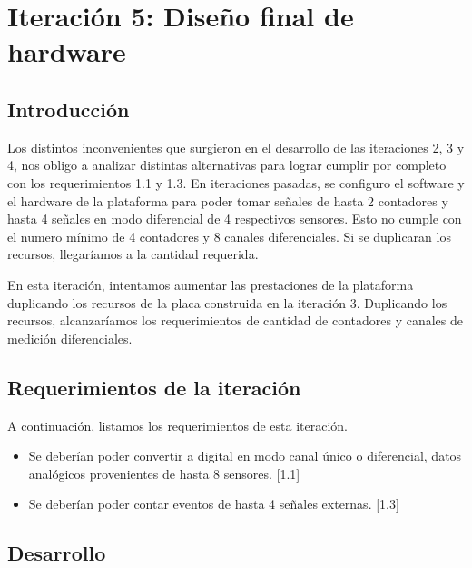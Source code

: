 \chapter{Iteración 5: Diseño final de hardware} %
\label{cha:iteracion_5}

\section{Introducción} %
\label{it5:sec:introduccion}

Los distintos inconvenientes que surgieron en el desarrollo de las iteraciones 2, 3 y 4, nos obligo a analizar distintas alternativas para lograr cumplir por completo con los requerimientos 1.1 y 1.3. En iteraciones pasadas, se configuro el software y el hardware de la plataforma para poder tomar señales de hasta 2 contadores y hasta 4 señales en modo diferencial de 4 respectivos sensores. Esto no cumple con el numero mínimo de 4 contadores y 8 canales diferenciales. Si se duplicaran los recursos, llegaríamos a la cantidad requerida.

En esta iteración, intentamos aumentar las prestaciones de la plataforma duplicando los recursos de la placa construida en la iteración 3. Duplicando los recursos, alcanzaríamos los requerimientos de cantidad de contadores y canales de medición diferenciales.


\section{Requerimientos de la iteración} %
\label{it5:sec:requerimientos_de_la_iteracion}

A continuación, listamos los requerimientos de esta iteración.

\begin{itemize}
  \item Se deberían poder convertir a digital en modo canal único o diferencial, datos analógicos provenientes de hasta 8 sensores. [1.1]
  \item Se deberían poder contar eventos de hasta 4 señales externas. [1.3]
\end{itemize}


\section{Desarrollo} %
\label{it5:sec:desarrollo}

